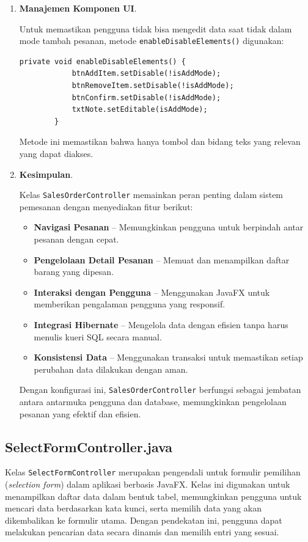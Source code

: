 \begin{enumerate}
	\item \textbf{Manajemen Komponen UI}.
	
	Untuk memastikan pengguna tidak bisa mengedit data saat tidak dalam mode tambah pesanan, metode \texttt{enableDisableElements()} digunakan:
	
	\begin{lstlisting}[style=JavaStyle]
		private void enableDisableElements() {
			btnAddItem.setDisable(!isAddMode);
			btnRemoveItem.setDisable(!isAddMode);
			btnConfirm.setDisable(!isAddMode);
			txtNote.setEditable(isAddMode);
		}
	\end{lstlisting}
	
	Metode ini memastikan bahwa hanya tombol dan bidang teks yang relevan yang dapat diakses.
	
	\item \textbf{Kesimpulan}.
	
	Kelas \texttt{SalesOrderController} memainkan peran penting dalam sistem pemesanan dengan menyediakan fitur berikut:
	
	\begin{itemize}
		\item \textbf{Navigasi Pesanan} – Memungkinkan pengguna untuk berpindah antar pesanan dengan cepat.
		\item \textbf{Pengelolaan Detail Pesanan} – Memuat dan menampilkan daftar barang yang dipesan.
		\item \textbf{Interaksi dengan Pengguna} – Menggunakan JavaFX untuk memberikan pengalaman pengguna yang responsif.
		\item \textbf{Integrasi Hibernate} – Mengelola data dengan efisien tanpa harus menulis kueri SQL secara manual.
		\item \textbf{Konsistensi Data} – Menggunakan transaksi untuk memastikan setiap perubahan data dilakukan dengan aman.
	\end{itemize}
	
	Dengan konfigurasi ini, \texttt{SalesOrderController} berfungsi sebagai jembatan antara antarmuka pengguna dan database, memungkinkan pengelolaan pesanan yang efektif dan efisien.
	
\end{enumerate}


\subsection{SelectFormController.java}

Kelas \texttt{SelectFormController} merupakan pengendali untuk formulir pemilihan (\textit{selection form}) dalam aplikasi berbasis JavaFX. Kelas ini digunakan untuk menampilkan daftar data dalam bentuk tabel, memungkinkan pengguna untuk mencari data berdasarkan kata kunci, serta memilih data yang akan dikembalikan ke formulir utama. Dengan pendekatan ini, pengguna dapat melakukan pencarian data secara dinamis dan memilih entri yang sesuai.

